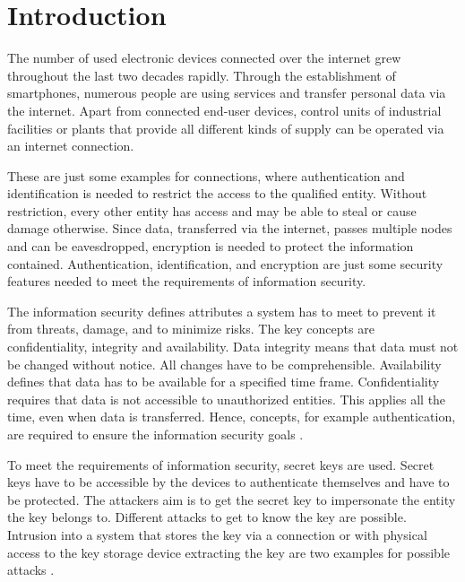 \chapter{Introduction}
\label{cap:introduction}

The number of used electronic devices connected over the internet grew throughout the last two decades rapidly.
Through the establishment of smartphones, numerous people are using services and transfer personal data via the internet. %
Apart from connected end-user devices, control units of industrial facilities or plants that provide all different kinds of supply can be operated via an internet connection. %

These are just some examples for connections, where authentication and identification is needed to restrict the access to the qualified entity.
Without restriction, every other entity has access and may be able to steal or cause damage otherwise. %
Since data, transferred via the internet, passes multiple nodes and can be eavesdropped, encryption is needed to protect the information contained.
Authentication, identification, and encryption are just some security features needed to meet the requirements of information security.

The information security defines attributes a system has to meet to prevent it from threats, damage, and to minimize risks.
The key concepts are confidentiality, integrity and availability. %
Data integrity means that data must not be changed without notice.
All changes have to be comprehensible.
Availability defines that data has to be available for a specified time frame. %
Confidentiality requires that data is not accessible to unauthorized entities.
This applies all the time, even when data is transferred.
Hence, concepts, for example authentication, are required to ensure the information security goals \cite{ISO27000}.

To meet the requirements of information security, secret keys are used.
Secret keys have to be accessible by the devices to authenticate themselves and have to be protected. %
The attackers aim is to get the secret key to impersonate the entity the key belongs to.
Different attacks to get to know the key are possible.
Intrusion into a system that stores the key via a connection or with physical access to the key storage device extracting the key are two examples for possible attacks \cite{IETF2000InternetGlossary,Skorobogatov2012PhysicalResistance}.
\pagebreak

